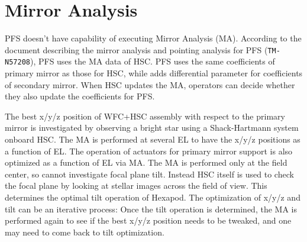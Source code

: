 \section{Mirror Analysis}\label{sec:MA}
PFS doesn't have capability of executing Mirror Analysis (MA).
According to the document describing the mirror analysis and pointing analysis for PFS ({\tt TM-N57208}), PFS uses the MA data of HSC.
PFS uses the same coefficients of primary mirror as those for HSC, while adds differential parameter for coefficients of secondary mirror. 
When HSC updates the MA, operators can decide whether they also update the coefficients for PFS.

The best x/y/z position of WFC+HSC assembly with respect to the primary mirror is investigated by observing a bright star using a Shack-Hartmann system onboard HSC. 
The MA is performed at several EL to have the x/y/z positions as a function of EL. The operation of actuators for primary mirror support is also optimized as a function of EL via MA.
The MA is performed only at the field center, so cannot investigate focal plane tilt. Instead HSC itself is used to check the focal plane by looking at stellar images across the field of view. This determines the optimal tilt operation of Hexapod.
The optimization of x/y/z and tilt can be an iterative process: Once the tilt operation is determined, the MA is performed again to see if the best x/y/z position needs to be tweaked, and one may need to come back to tilt optimization.

